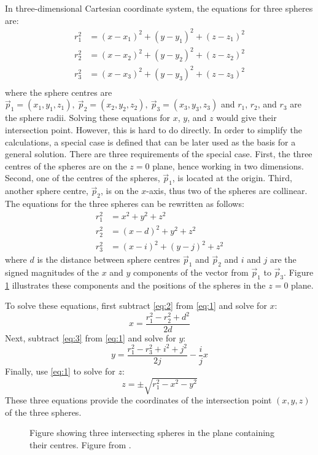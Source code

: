 In three-dimensional Cartesian coordinate system, the equations for three spheres are:
\begin{align*}
	r_1^2 &=(x-x_1)^2+(y-y_1)^2+(z-z_1)^2 \\
	r_2^2 &=(x-x_2)^2+(y-y_2)^2+(z-z_2)^2 \\
	r_3^2 &=(x-x_3)^2+(y-y_3)^2+(z-z_3)^2 \\
\end{align*}
where the sphere centres are $\vec p_1 = (x_1, y_1, z_1), \ \vec p_2 = (x_2, y_2, z_2), \ \vec p_3 = (x_3, y_3, z_3)$ and $r_1$, $r_2$, and $r_3$ are the sphere radii. Solving these equations for $x$, $y$, and $z$ would give their intersection point. However, this is hard to do directly. In order to simplify the calculations, a special case is defined that can be later used as the basis for a general solution. There are three requirements of the special case. First, the three centres of the spheres are on the $z=0$ plane, hence working in two dimensions. Second, one of the centres of the spheres, $\vec p_1$, is located at the origin. Third, another sphere centre, $\vec p_2$, is on the $x$-axis, thus two of the spheres are collinear. The equations for the three spheres can be rewritten as follows:
\begin{align}
	r_1^2 & =x^2+y^2+z^2 \label{eq:1}\\
	r_2^2 & =(x-d)^2+y^2+z^2 \label{eq:2}\\
	r_3^2 & =(x-i)^2+(y-j)^2+z^2 \label{eq:3}
\end{align}
where $d$ is the distance between sphere centres $\vec p_1$ and $\vec p_2$ and $i$ and $j$ are the signed magnitudes of the $x$ and $y$ components of the vector from $\vec p_1$ to $\vec p_3$. Figure \ref{fig:trilat2} illustrates these components and the positions of the spheres in the $z=0$ plane.

To solve these equations, first subtract \ref{eq:2} from \ref{eq:1} and solve for $x$:
\[x=\frac{r_1^2-r_2^2+d^2}{2d}\]
Next, subtract \ref{eq:3} from \ref{eq:1} and solve for $y$:
\[y=\frac{r_1^2-r_3^2+i^2+j^2}{2j}-\frac{i}{j}x\]
Finally, use \ref{eq:1} to solve for $z$:
\[z=\pm \sqrt{r_1^2-x^2-y^2}\]
These three equations  provide the coordinates of the intersection point $(x,y,z)$ of the three spheres.

\begin{figure}[h]
	\begin{center}
		\def\svgwidth{0.6\textwidth}
		
		\caption{Figure showing three intersecting spheres in the plane containing their centres. Figure from \cite{Wikipedi2013}.}
		\label{fig:trilat2}
	\end{center}
\end{figure}

